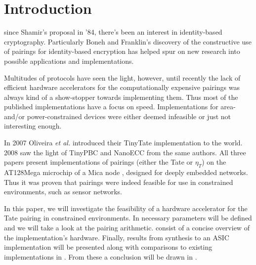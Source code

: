 \section{Introduction\label{section-introduction}}

 since Shamir's proposal \cite{shamir} in '84, there's been an interest in identity-based cryptography. Particularly Boneh and Franklin's \cite{boneh} discovery of the constructive use of pairings for identity-based encryption has helped spur on new research into possible applications and implementations.

Multitudes of protocols have seen the light, however, until recently the lack of efficient hardware accelerators for the computationally expensive pairings was always kind of a show-stopper towards implementing them. Thus most of the published implementations have a focus on speed. Implementations for area- and/or power-constrained devices were either deemed infeasible or just not interesting enough. 

In 2007 Oliveira \emph{et al.} introduced their TinyTate \cite{tinytate} implementation to the world. 2008 saw the light of TinyPBC \cite{tinypbc} and NanoECC \cite{nanoecc} from the same authors. All three papers present implementations of pairings (either the Tate or $\eta_T$) on the AT128Mega microchip of a Mica node \cite{mica}, designed for deeply embedded networks. Thus it was proven that pairings were indeed feasible for use in constrained environments, such as sensor networks.

In this paper, we will investigate the feasibility of a hardware accelerator for the Tate pairing in constrained environments. In  necessary parameters will be defined and we will take a look at the pairing arithmetic.  consist of a concise overview of the implementation's hardware. Finally, results from synthesis to an ASIC implementation will be presented along with comparisons to existing implementations in . From these a conclusion will be drawn in .
